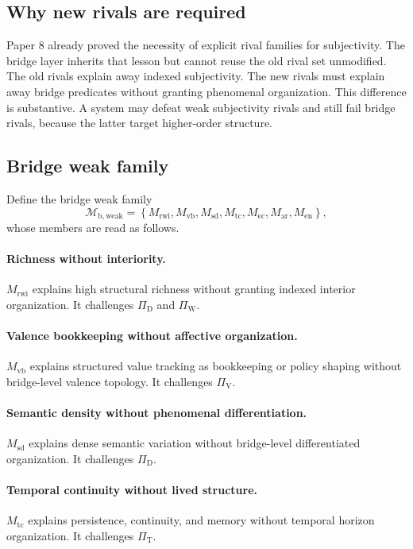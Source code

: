 \documentclass[11pt,a4paper]{article}
\theoremstyle{definition}
\newcommand{\PiD}{\Pi_{\mathrm{D}}}
\newcommand{\PiV}{\Pi_{\mathrm{V}}}
\newcommand{\PiW}{\Pi_{\mathrm{W}}}
\newcommand{\PiT}{\Pi_{\mathrm{T}}}
\newcommand{\BridgeWeakFam}{\mathcal{M}_{\mathrm{b,weak}}}
\begin{document}
\subsection{Why new rivals are required}
Paper 8 already proved the necessity of explicit rival families for subjectivity. The bridge layer inherits that lesson but cannot reuse the old rival set unmodified. The old rivals explain away indexed subjectivity. The new rivals must explain away bridge predicates without granting phenomenal organization. This difference is substantive. A system may defeat weak subjectivity rivals and still fail bridge rivals, because the latter target higher-order structure.

\subsection{Bridge weak family}
Define the bridge weak family
\[
\BridgeWeakFam=
\left\{
M_{\mathrm{rwi}},
M_{\mathrm{vb}},
M_{\mathrm{sd}},
M_{\mathrm{tc}},
M_{\mathrm{ec}},
M_{\mathrm{ar}},
M_{\mathrm{en}}
\right\},
\]
whose members are read as follows.

\paragraph{Richness without interiority.}
$M_{\mathrm{rwi}}$ explains high structural richness without granting indexed interior organization. It challenges $\PiD$ and $\PiW$.

\paragraph{Valence bookkeeping without affective organization.}
$M_{\mathrm{vb}}$ explains structured value tracking as bookkeeping or policy shaping without bridge-level valence topology. It challenges $\PiV$.

\paragraph{Semantic density without phenomenal differentiation.}
$M_{\mathrm{sd}}$ explains dense semantic variation without bridge-level differentiated organization. It challenges $\PiD$.

\paragraph{Temporal continuity without lived structure.}
$M_{\mathrm{tc}}$ explains persistence, continuity, and memory without temporal horizon organization. It challenges $\PiT$.
\end{document}
